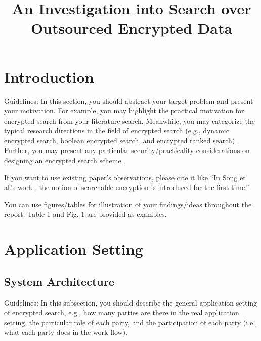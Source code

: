 \documentclass[conference]{IEEEtran}
\begin{document}
\title{An Investigation into Search over Outsourced Encrypted Data}

\author{
\and

\and

}

\maketitle


\section{Introduction}
Guidelines: In this section, you should abstract your target problem and present your motivation.
For example, you may highlight the practical motivation for encrypted search from your literature search. 
%
Meanwhile, you may categorize the typical research directions in the field of encrypted search (e.g., dynamic encrypted search, boolean encrypted search, and encrypted ranked search).
%
Further, you may present any particular security/practicality considerations on designing an encrypted search scheme.




If you want to use existing paper’s observations, please cite it like “In Song et al.'s work \cite{SongWP00}, the notion of searchable encryption is introduced for the first time.”



You can use figures/tables for illustration of your findings/ideas throughout the report. Table 1 and Fig. 1 are provided as examples.




\section{Application Setting}

\subsection{System Architecture}
Guidelines: In this subsection, you should describe the general application setting of encrypted search, e.g., how many parties are there in the real application setting, the particular role of each party, and the participation of each party (i.e., what each party does in  the work flow).
\end{document}
